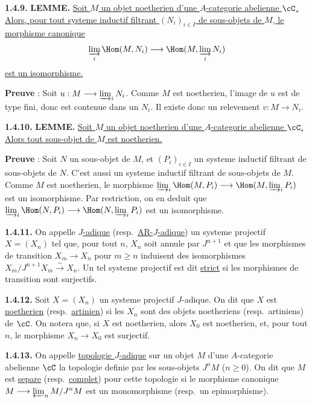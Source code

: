 \medskip
\noindent\textbf{1.4.9.} \textbf{LEMME.} \underline{Soit $M$ un objet noetherien d'une $A$-categorie abelienne $\cC$. Alors, pour tout systeme inductif filtrant $(N_i)_{i \in I}$ de sous-objets de $M$, le morphisme canonique}
\[
\varinjlim_i \Hom(M, N_i) \longrightarrow \Hom(M, \varinjlim_i N_i)
\]
\underline{est un isomorphisme.}

\textbf{Preuve} : Soit $u : M \longrightarrow \varinjlim_i N_i$. Comme $M$ est noetherien, l'image de $u$ est de type fini, donc est contenue dans un $N_i$. Il existe donc un relevement $v : M \longrightarrow N_i$.

\medskip
\noindent\textbf{1.4.10.} \textbf{LEMME.} \underline{Soit $M$ un objet noetherien d'une $A$-categorie abelienne $\cC$. Alors tout sous-objet de $M$ est noetherien.}

\textbf{Preuve} : Soit $N$ un sous-objet de $M$, et $(P_i)_{i \in I}$ un systeme inductif filtrant de sous-objets de $N$. C'est aussi un systeme inductif filtrant de sous-objets de $M$. Comme $M$ est noetherien, le morphisme $\varinjlim_i \Hom(M,P_i) \longrightarrow \Hom(M, \varinjlim_i P_i)$ est un isomorphisme. Par restriction, on en deduit que $\varinjlim_i \Hom(N,P_i) \longrightarrow \Hom(N, \varinjlim_i P_i)$ est un isomorphisme.

\medskip
\noindent\textbf{1.4.11.} On appelle \underline{$J$-adique} (resp.\ \underline{AR-$J$-adique}) un systeme projectif $X = (X_n)$ tel que, pour tout $n$, $X_n$ soit annule par $J^{n+1}$ et que les morphismes de transition $X_m \longrightarrow X_n$ pour $m \geq n$ induisent des isomorphismes $X_m / J^{n+1} X_m \xrightarrow{\sim} X_n$. Un tel systeme projectif est dit \underline{strict} si les morphismes de transition sont surjectifs.

\medskip
\noindent\textbf{1.4.12.} Soit $X = (X_n)$ un systeme projectif $J$-adique. On dit que $X$ est \underline{noetherien} (resp.\ \underline{artinien}) si les $X_n$ sont des objets noetheriens (resp.\ artiniens) de $\cC$. On notera que, si $X$ est noetherien, alors $X_0$ est noetherien, et, pour tout $n$, le morphisme $X_n \longrightarrow X_0$ est surjectif.

\medskip
\noindent\textbf{1.4.13.} On appelle \underline{topologie $J$-adique} sur un objet $M$ d'une $A$-categorie abelienne $\cC$ la topologie definie par les sous-objets $J^n M$ ($n \geq 0$). On dit que $M$ est \underline{separe} (resp.\ \underline{complet}) pour cette topologie si le morphisme canonique $M \longrightarrow \varprojlim_n M/J^n M$ est un monomorphisme (resp.\ un epimorphisme).

